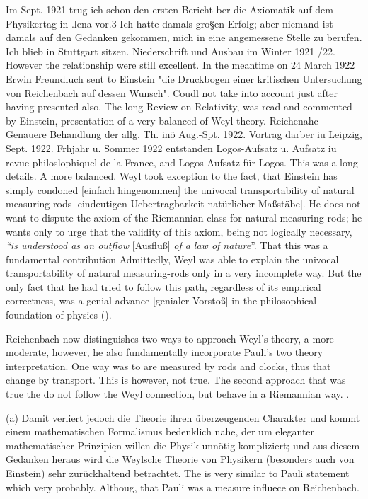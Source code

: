 \documentclass[draft]{article}
\begin{document}
{Im Sept. 1921 trug ich schon den ersten Bericht ber die Axiomatik auf dem Physikertag in .lena vor.3 Ich hatte damals gro§en Erfolg; aber niemand ist damals auf den Gedanken gekommen, mich in eine angemessene Stelle zu berufen. Ich blieb in Stuttgart sitzen. Niederschrift und Ausbau im Winter 1921 /22. However the relationship were still excellent. In the meantime on 24 March 1922 Erwin Freundluch sent to Einstein "die Druckbogen einer kritischen Untersuchung von Reichenbach auf dessen Wunsch".  Coudl not take into account just after having presented also. The long Review on Relativity, was read and commented by Einstein, presentation of a very balanced of Weyl theory. Reichenahc Genauere Behandlung der allg. Th. inõ Aug.-Spt. 1922. Vortrag darber iu Leipzig, Sept. 1922. Frhjahr u. Sommer 1922 entstanden Logos-Aufsatz u. Aufsatz iu revue philoslophiquel de la France, and Logos Aufsatz für Logos. This was a long details. A more balanced. Weyl took exception to the fact, that Einstein has simply condoned [einfach hingenommen] the univocal transportability of natural measuring-rods [eindeutigen Uebertragbarkeit natürlicher Maßstäbe]. He does not want to dispute the axiom of the Riemannian class for natural measuring rods; he wants only to urge that the validity of this axiom, being not logically necessary, \emph{``is understood as an outflow }[Ausfluß]\emph{ of a law of nature}''. That this was a fundamental contribution Admittedly, Weyl was able to explain the univocal transportability of natural measuring-rods only in a very incomplete way}. But the only fact that he had tried to follow this path, regardless of its empirical correctness, was a genial advance [genialer Vorstoß] in the philosophical foundation of physics (\citealp[367f.]{Reichenbach1921}).

Reichenbach now distinguishes two ways to approach Weyl's theory, a more moderate, however, he also fundamentally incorporate Pauli's two theory interpretation. One way was to are measured by rods and clocks, thus that change by transport. This is however, not true. The second approach that was true the do not follow the Weyl connection, but behave in a Riemannian way. . 

(a) Damit verliert jedoch die Theorie ihren überzeugenden Charakter und kommt einem mathematischen Formalismus bedenklich nahe, der um eleganter mathematischer Prinzipien willen die Physik unnötig kompliziert; und aus diesem Gedanken heraus wird die Weylsche Theorie von Physikern (besonders auch von Einstein) sehr zurückhaltend betrachtet. The is very similar to Pauli statement which very probably. Althoug, that Pauli was a measure influece on Reichenbach.
\end{document}
